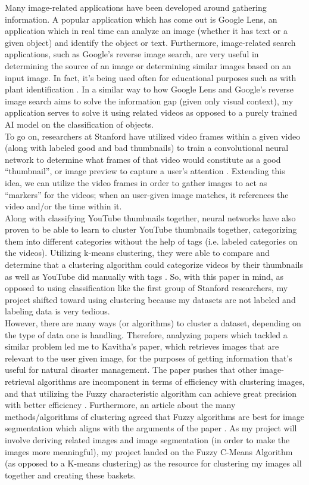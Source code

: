 \documentclass[10pt,twocolumn]{article}
\begin{document}
Many image-related applications have been developed around gathering information. A popular application which has come out is Google Lens, an application which in real time can analyze an image (whether it has text or a given object) and identify the object or text. Furthermore, image-related search applications, such as Google’s reverse image search, are very useful in determining the source of an image or determining similar images based on an input image. In fact, it’s being used often for educational purposes such as with plant identification \cite{Moore2018}. In a similar way to how Google Lens and Google’s reverse image search aims to solve the information gap (given only visual context), my application serves to solve it using related videos as opposed to a purely trained AI model on the classification of objects. \\ 
\indent To go on, researchers at Stanford have utilized video frames within a given video (along with labeled good and bad thumbnails) to train a convolutional neural network to determine what frames of that video would constitute as a good “thumbnail”, or image preview to capture a user’s attention \cite{Stanford2017}. Extending this idea, we can utilize the video frames in order to gather images to act as “markers” for the videos; when an user-given image matches, it references the video and/or the time within it.\\
\indent Along with classifying YouTube thumbnails together, neural networks have also proven to be able to learn to cluster YouTube thumbnails together, categorizing them into different categories without the help of tags (i.e. labeled categories on the videos). Utilizing k-means clustering, they were able to compare and determine that a clustering algorithm could categorize videos by their thumbnails as well as YouTube did manually with tags \cite{Stanford2021}. So, with this paper in mind, as opposed to using classification like the first group of Stanford researchers, my project shifted toward using clustering because my datasets are not labeled and labeling data is very tedious. \\
\indent However, there are many ways (or algorithms) to cluster a dataset, depending on the type of data one is handling. Therefore, analyzing papers which tackled a similar problem led me to Kavitha’s paper, which retrieves images that are relevant to the user given image, for the purposes of getting information that’s useful for natural disaster management. The paper pushes that other image-retrieval algorithms are incomponent in terms of efficiency with clustering images, and that utilizing the Fuzzy characteristic algorithm can achieve great precision with better efficiency \cite{Kavitha2020}. Furthermore, an article about the many methods/algorithms of clustering agreed that Fuzzy algorithms are best for image segmentation which aligns with the arguments of the paper \cite{PrasadClustering}. As my project will involve deriving related images and image segmentation (in order to make the images more meaningful), my project landed on the Fuzzy C-Means Algorithm (as opposed to a K-means clustering) as the resource for clustering my images all together and creating these baskets.
\end{document}
